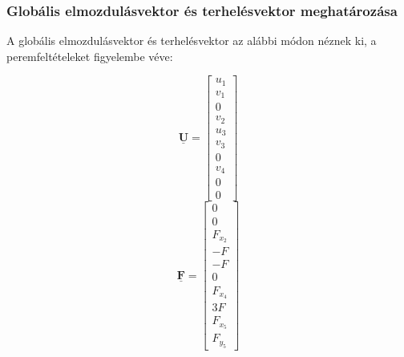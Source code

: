 \documentclass[12pt,a4paper]{article}
\def\vec#1{\underline{\mathrm{#1}}}
\begin{document}
\subsubsection{Globális elmozdulásvektor és terhelésvektor meghatározása}
A globális elmozdulásvektor és terhelésvektor az alábbi módon néznek ki, a peremfeltételeket
figyelembe véve:
\begin{multicols}{2}
    \noindent
    \begin{equation}
        \vec{\mathbf{U}}=
        \begin{bmatrix}
            u_1 \\
            v_1 \\
            0   \\
            v_2 \\
            u_3 \\
            v_3 \\
            0   \\
            v_4 \\
            0   \\
            0
        \end{bmatrix}
    \end{equation}
    \columnbreak
    \begin{equation}
        \vec{\mathbf{F}}=
        \begin{bmatrix}
            0       \\
            0       \\
            F_{x_2} \\
            -F      \\
            -F      \\
            0       \\
            F_{x_4} \\
            3 F     \\
            F_{x_5} \\
            F_{y_5}
        \end{bmatrix}
    \end{equation}
\end{multicols}

\newpage
\tableofcontents
\end{document}
